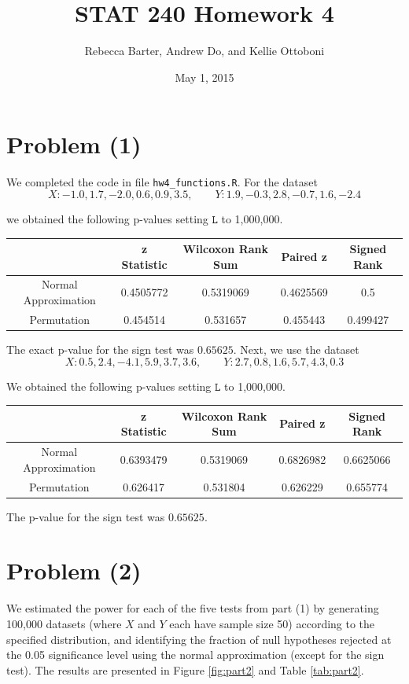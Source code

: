 \documentclass[11pt]{article}
\title{STAT 240 Homework 4}
\author{Rebecca Barter, Andrew Do, and Kellie Ottoboni}
\date{May 1, 2015} %
\begin{document}
\maketitle


\section*{Problem (1)}
We completed the code in file \texttt{hw4\_functions.R}.  For the dataset 
$$X: -1.0, 1.7, -2.0, 0.6, 0.9, 3.5, \qquad Y : 1.9, -0.3, 2.8, -0.7, 1.6, -2.4$$

we obtained the following p-values setting $\texttt{L}$ to 1,000,000.
\begin{table}[htdp]
\begin{center}
\begin{tabular}{|c|c|c|c|c|}
\hline
 & z Statistic & Wilcoxon Rank Sum & Paired z & Signed Rank  \\ \hline
Normal Approximation & 0.4505772 & 0.5319069 & 0.4625569 & 0.5   \\
Permutation & 0.454514 & 0.531657 & 0.455443 & 0.499427  \\ \hline
\end{tabular}
\end{center}
\label{default}
\end{table}%
 The exact p-value for the sign test was $0.65625$.  Next, we use the dataset 
$$X: 0.5, 2.4, -4.1, 5.9, 3.7, 3.6, \qquad Y : 2.7, 0.8, 1.6, 5.7, 4.3, 0.3$$

We obtained the following p-values setting $\texttt{L}$ to 1,000,000.
\begin{table}[htdp]
\begin{center}
\begin{tabular}{|c|c|c|c|c|}
\hline
 & z Statistic & Wilcoxon Rank Sum & Paired z & Signed Rank  \\ \hline
Normal Approximation & 0.6393479 & 0.5319069 & 0.6826982 & 0.6625066   \\
Permutation & 0.626417 &  0.531804 & 0.626229 & 0.655774  \\ \hline
\end{tabular}
\end{center}
\label{default}
\end{table}%

The p-value for the sign test was $ 0.65625$.

\newpage
\section*{Problem (2)}
We estimated the power for each of the five tests from part (1) by generating 100,000 datasets (where $X$ and $Y$ each have sample size 50) according to the specified distribution, and identifying the fraction of null hypotheses rejected at the 0.05 significance level using the normal approximation (except for the sign test). The results are presented in Figure \ref{fig:part2} and Table \ref{tab:part2}.
\end{document}
